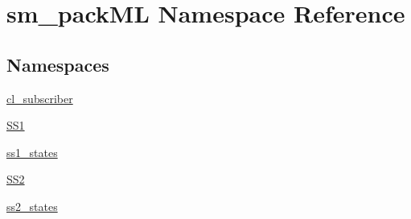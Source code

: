 \hypertarget{namespacesm__packML}{}\section{sm\+\_\+pack\+ML Namespace Reference}
\label{namespacesm__packML}
\subsection*{Namespaces}
\begin{DoxyCompactItemize}
\item 
 \hyperlink{namespacesm__packML_1_1cl__subscriber}{cl\+\_\+subscriber}
\item 
 \hyperlink{namespacesm__packML_1_1SS1}{S\+S1}
\item 
 \hyperlink{namespacesm__packML_1_1ss1__states}{ss1\+\_\+states}
\item 
 \hyperlink{namespacesm__packML_1_1SS2}{S\+S2}
\item 
 \hyperlink{namespacesm__packML_1_1ss2__states}{ss2\+\_\+states}
\end{DoxyCompactItemize}
